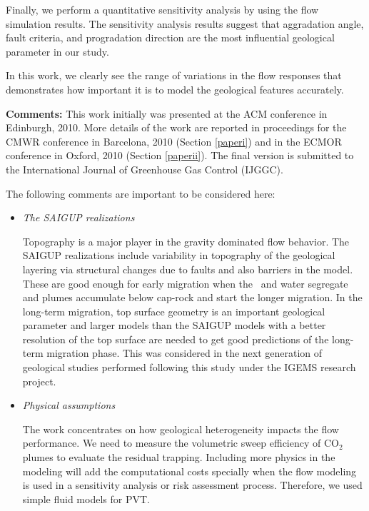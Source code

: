 {Finally, we perform a quantitative sensitivity analysis by using the flow simulation results. The sensitivity analysis results suggest that aggradation angle, fault criteria, and progradation direction are the most influential geological parameter in our study.

In this work, we clearly see the range of variations in the flow responses that demonstrates how important it is to model the geological features accurately. 

\vspace{0.5cm}
\noindent\textbf{Comments:}
This work initially was presented at the ACM conference in Edinburgh,  2010. More details of the work are reported in proceedings for the CMWR conference in Barcelona, 2010 (Section \ref{paperi}) and in the ECMOR conference in Oxford, 2010 (Section \ref{paperii}). The final version is submitted to the International Journal of Greenhouse Gas Control (IJGGC). 

The following comments are important to be considered here:

\begin{itemize}

\item \textit{The SAIGUP realizations}
 
Topography is a major player in the gravity dominated flow behavior. The SAIGUP
realizations include variability in topography of the geological layering via
structural changes due to faults and also barriers in the model. These are good
enough for early migration when the \coo\ and water segregate and plumes
accumulate below cap-rock and start the longer migration. In the long-term
migration, top surface geometry is an important geological parameter and
larger models than the SAIGUP models with a better resolution of the top surface
are needed to get good predictions of the long-term migration phase. This
was considered in the next generation of geological studies performed following
this study \cite{syversveenstudy,nilsen2012impact} under the IGEMS research
project.

\item \textit{Physical assumptions}
 
The work concentrates on how geological heterogeneity impacts the flow
performance. We need to measure the volumetric sweep efficiency of $\mbox{CO}_2$
plumes to evaluate the residual trapping. Including more
physics in the modeling will add the computational costs specially when the flow
modeling is used in a sensitivity analysis or risk assessment process.
Therefore, we used simple fluid models for PVT. 


\end{itemize}}
